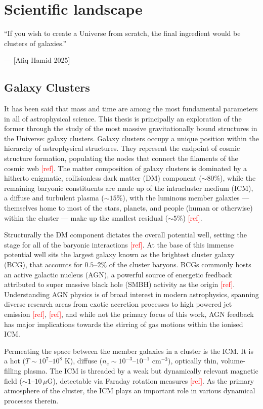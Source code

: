 \chapter[Introduction]{Scientific landscape}
\label{Chap:scientificLandscape}
\epigraph{``If you wish to create a Universe from scratch, the final ingredient would be clusters of galaxies.''}{— [Afiq Hamid 2025]}
\section{Galaxy Clusters}\label{Chap:scientificLandscapeGalaxyClusters}
It has been said that mass and time are among the most fundamental parameters in all of astrophysical science. This thesis is principally an exploration of the former through the study of the most massive gravitationally bound structures in the Universe: galaxy clusters. 
\pbreak
Galaxy clusters occupy a unique position within the hierarchy of astrophysical structures. They represent the endpoint of cosmic structure formation, populating the nodes that connect the filaments of the cosmic web \textcolor{red}{[ref]}. The matter composition of galaxy clusters is dominated by a hitherto enigmatic, collisionless dark matter (DM) component ($\sim80\%$), while the remaining baryonic constituents are made up of the intracluster medium (ICM), a diffuse and turbulent plasma ($\sim15\%$), with the luminous member galaxies — themselves home to most of the stars, planets, and people (human or otherwise) within the cluster  — make up the smallest residual ($\sim5\%$) \textcolor{red}{[ref]}.

Structurally the DM component dictates the overall potential well, setting the stage for all of the baryonic interactions \textcolor{red}{[ref]}. At the base of this immense potential well sits the largest galaxy known as the brightest cluster galaxy (BCG), that accounts for $0.5$--$2\%$ of the cluster baryons. BCGs commonly hosts an active galactic nucleus (AGN), a powerful source of energetic feedback attributed to super massive black hole (SMBH) activity as the origin \textcolor{red}{[ref]}. Understanding AGN physics is of broad interest in modern astrophysics, spanning diverse research areas from exotic accretion processes to high powered jet emission \textcolor{red}{[ref]}, \textcolor{red}{[ref]}, and while not the primary focus of this work, AGN feedback has major implications towards the stirring of gas motions within the ionised ICM.

Permeating the space between the member galaxies in a cluster is the ICM. It is a hot ($T \sim 10^7$--$10^8$ K), diffuse ($n_e \sim 10^{-3}$--$10^{-1}$ cm$^{-3}$), optically thin, volume-filling plasma. The ICM is threaded by a weak but dynamically relevant magnetic field ($\sim1$--$10\,\mu$G), detectable via Faraday rotation measures \textcolor{red}{[ref]}. As the primary atmosphere of the cluster, the ICM plays an important role in various dynamical processes therein.


